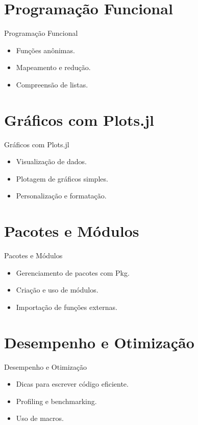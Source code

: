 \documentclass{beamer}
\begin{document}
\section{Programação Funcional}
\begin{frame}{Programação Funcional}
    \begin{itemize}
        \item Funções anônimas.
        \item Mapeamento e redução.
        \item Compreensão de listas.
    \end{itemize}
\end{frame}

\section{Gráficos com Plots.jl}
\begin{frame}{Gráficos com Plots.jl}
    \begin{itemize}
        \item Visualização de dados.
        \item Plotagem de gráficos simples.
        \item Personalização e formatação.
    \end{itemize}
\end{frame}

\section{Pacotes e Módulos}
\begin{frame}{Pacotes e Módulos}
    \begin{itemize}
        \item Gerenciamento de pacotes com Pkg.
        \item Criação e uso de módulos.
        \item Importação de funções externas.
    \end{itemize}
\end{frame}

\section{Desempenho e Otimização}
\begin{frame}{Desempenho e Otimização}
    \begin{itemize}
        \item Dicas para escrever código eficiente.
        \item Profiling e benchmarking.
        \item Uso de macros.
    \end{itemize}
\end{frame}
\end{document}
